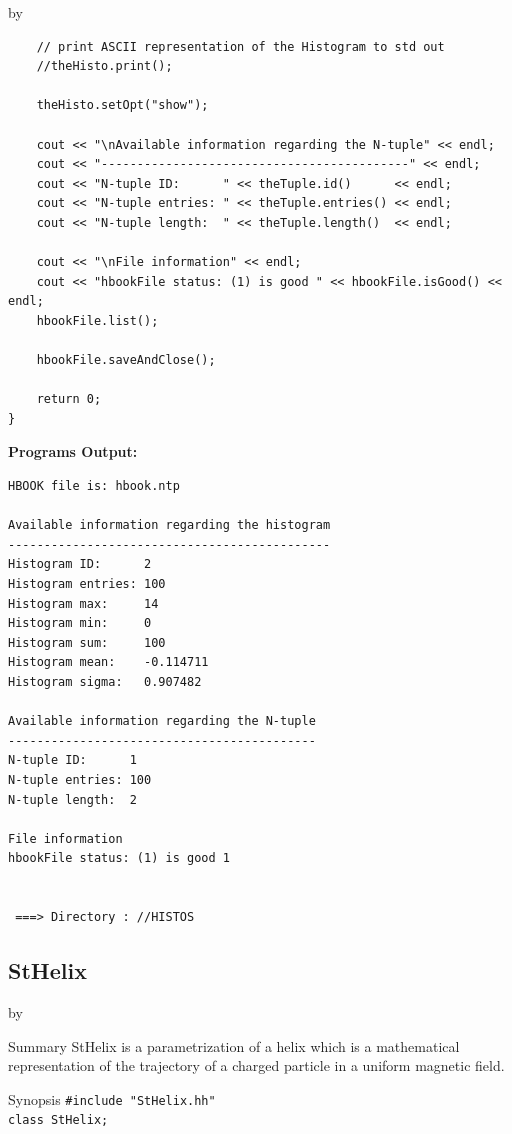 \documentclass[twoside]{article}
\newcommand{\entrylabel}[1]{\mbox{\textbf{{#1}}}\hfil}%
\newenvironment{entry}
{\begin{list}{}%
    {\renewcommand{\makelabel}{\entrylabel}%
     \setlength{\labelwidth}{90pt}%
     \setlength{\leftmargin}{\labelwidth}
     \advance\leftmargin by \labelsep%
      }%
    }%
  {\end{list}}
\newcommand{\Entrylabel}[1]%
{\raisebox{0pt}[1ex][0pt]{\makebox[\labelwidth][l]%
    {\parbox[t]{\labelwidth}{\hspace{0pt}\textbf{{#1}}}}}}
\newenvironment{Entry}%
{\renewcommand{\entrylabel}{\Entrylabel}\begin{entry}}%
  {\end{entry}}
\begin{document}
\begin{description}
\begin{Entry}
{\begin{verbatim}
    // print ASCII representation of the Histogram to std out
    //theHisto.print();

    theHisto.setOpt("show");

    cout << "\nAvailable information regarding the N-tuple" << endl;
    cout << "-------------------------------------------" << endl;
    cout << "N-tuple ID:      " << theTuple.id()      << endl;
    cout << "N-tuple entries: " << theTuple.entries() << endl;
    cout << "N-tuple length:  " << theTuple.length()  << endl;

    cout << "\nFile information" << endl;
    cout << "hbookFile status: (1) is good " << hbookFile.isGood() << endl;
    hbookFile.list();
    
    hbookFile.saveAndClose();

    return 0;
}
\end{verbatim}
}%
{\bf Programs Output:}
{\footnotesize
\begin{verbatim}
HBOOK file is: hbook.ntp

Available information regarding the histogram
---------------------------------------------
Histogram ID:      2
Histogram entries: 100
Histogram max:     14
Histogram min:     0
Histogram sum:     100
Histogram mean:    -0.114711
Histogram sigma:   0.907482

Available information regarding the N-tuple
-------------------------------------------
N-tuple ID:      1
N-tuple entries: 100
N-tuple length:  2

File information
hbookFile status: (1) is good 1


 ===> Directory : //HISTOS
\end{verbatim}
} %
\end{Entry}

\clearpage
  
  
%
%
\subsection{StHelix } \label{StHelix}
\begin{Entry}
\item[Summary]
    StHelix is a parametrization of a helix which is a mathematical
    representation of the trajectory of a charged particle in a
    uniform magnetic field.

\item[Synopsis]
    \verb+#include "StHelix.hh"+\\
    \verb+class StHelix;+
    

\end{Entry}
\end{description}
\end{document}
